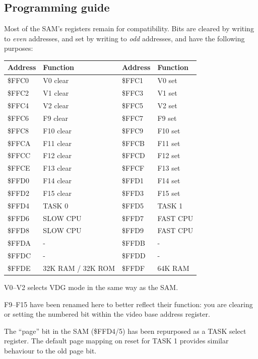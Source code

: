 \documentclass[12pt]{article}
\begin{document}
\subsection*{Programming guide}

Most of the SAM's registers remain for compatibility.  Bits are cleared by
writing to \textit{even} addresses, and set by writing to \textit{odd}
addresses, and have the following purposes:

\begin{table}[H]
\small
\centering
\setlength\tabcolsep{4pt}
\begin{tabular}{llll}
Address & Function & Address & Function \\ \hline\rule{0pt}{2.6ex}\rule[-0.9ex]{0pt}{0pt}%
\$FFC0 & V0 clear & \$FFC1 & V0 set \\
\$FFC2 & V1 clear & \$FFC3 & V1 set \\
\$FFC4 & V2 clear & \$FFC5 & V2 set \\
\$FFC6 & F9 clear & \$FFC7 & F9 set \\
\$FFC8 & F10 clear & \$FFC9 & F10 set \\
\$FFCA & F11 clear & \$FFCB & F11 set \\
\$FFCC & F12 clear & \$FFCD & F12 set \\
\$FFCE & F13 clear & \$FFCF & F13 set \\
\$FFD0 & F14 clear & \$FFD1 & F14 set \\
\$FFD2 & F15 clear & \$FFD3 & F15 set \\
\$FFD4 & TASK 0 & \$FFD5 & TASK 1 \\
\$FFD6 & SLOW CPU & \$FFD7 & FAST CPU \\
\$FFD8 & SLOW CPU & \$FFD9 & FAST CPU \\
\$FFDA & - & \$FFDB & - \\
\$FFDC & - & \$FFDD & - \\
\$FFDE & 32K RAM / 32K ROM & \$FFDF & 64K RAM
\end{tabular}
\end{table}

V0--V2 selects VDG mode in the same way as the SAM.

F9--F15 have been renamed here to better reflect their function: you are
clearing or setting the numbered bit within the video base address register.

The ``page'' bit in the SAM (\$FFD4/5) has been repurposed as a TASK select
register.  The default page mapping on reset for TASK 1 provides similar
behaviour to the old page bit.
\end{document}
